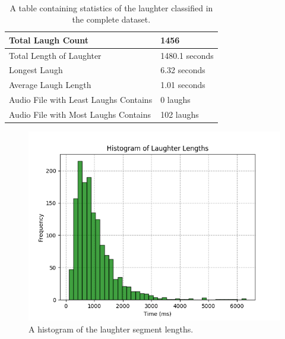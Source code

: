 \documentclass[a4paper,11pt,notitlepage]{article}
\begin{document}
\\ 
\begin{table}[]
\centering
\begin{tabular}{|l|l|}
\hline
Total Laugh Count                     & 1456           \\ \hline
Total Length of Laughter              & 1480.1 seconds \\ \hline
Longest Laugh                         & 6.32 seconds   \\ \hline
Average Laugh Length                  & 1.01 seconds   \\ \hline
Audio File with Least Laughs Contains & 0 laughs       \\ \hline
Audio File with Most Laughs Contains  & 102 laughs     \\ \hline
\end{tabular}
\caption{A table containing statistics of the laughter classified in the complete dataset.}
\label{laughter_stats_table}
\end{table}
\begin{figure}[H]
	\centering
	\vspace{0.5cm}
	\includegraphics[scale = 0.8]{figs/laughter_length_histogram.png}
	\caption{A histogram of the laughter segment lengths.}
	\label{laughter_length_histogram}
\end{figure}
\end{document}
